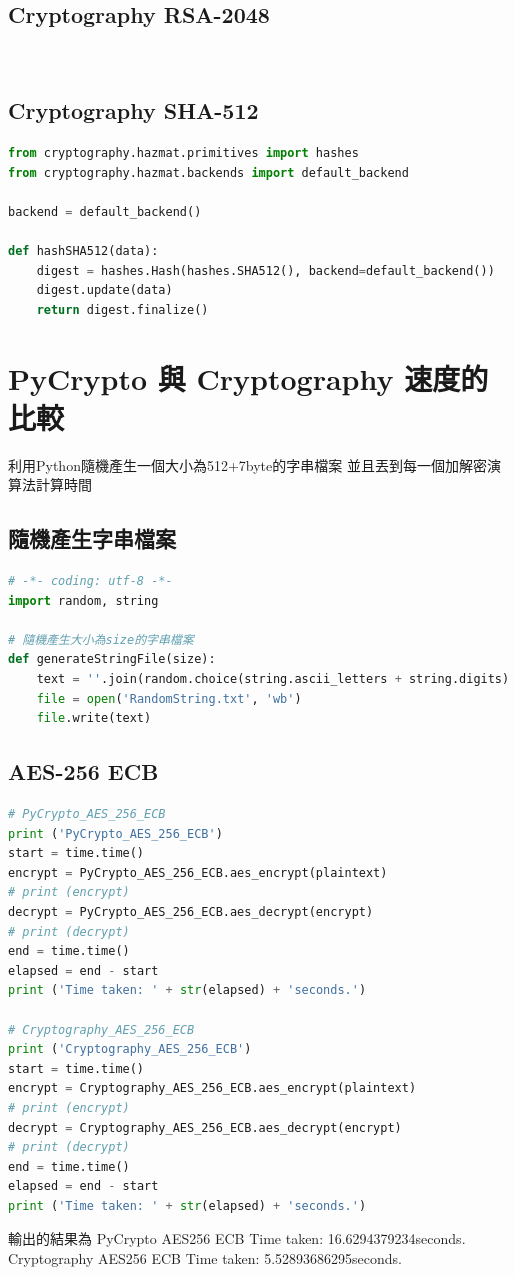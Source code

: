 \documentclass[12pt,a4paper]{article}
\begin{document}
\subsection{Cryptography RSA-2048}
{
\begin{lstlisting}[language=Python]
	
\end{lstlisting}
}

\subsection{Cryptography SHA-512}
{
\begin{lstlisting}[language=Python]
from cryptography.hazmat.primitives import hashes
from cryptography.hazmat.backends import default_backend

backend = default_backend()

def hashSHA512(data):
    digest = hashes.Hash(hashes.SHA512(), backend=default_backend())
    digest.update(data)
    return digest.finalize()
\end{lstlisting}
}

\newpage %
\section{PyCrypto 與 Cryptography 速度的比較}
利用Python隨機產生一個大小為512+7byte的字串檔案
並且丟到每一個加解密演算法計算時間
\subsection{隨機產生字串檔案}
{
\begin{lstlisting}[language=Python]
# -*- coding: utf-8 -*-
import random, string

# 隨機產生大小為size的字串檔案
def generateStringFile(size):
    text = ''.join(random.choice(string.ascii_letters + string.digits) for x in range(size))
    file = open('RandomString.txt', 'wb')
    file.write(text)
\end{lstlisting}
}

\subsection{AES-256 ECB}
{
\begin{lstlisting}[language=Python]
# PyCrypto_AES_256_ECB
print ('PyCrypto_AES_256_ECB')
start = time.time()
encrypt = PyCrypto_AES_256_ECB.aes_encrypt(plaintext)
# print (encrypt)
decrypt = PyCrypto_AES_256_ECB.aes_decrypt(encrypt)
# print (decrypt)
end = time.time()
elapsed = end - start
print ('Time taken: ' + str(elapsed) + 'seconds.')

# Cryptography_AES_256_ECB
print ('Cryptography_AES_256_ECB')
start = time.time()
encrypt = Cryptography_AES_256_ECB.aes_encrypt(plaintext)
# print (encrypt)
decrypt = Cryptography_AES_256_ECB.aes_decrypt(encrypt)
# print (decrypt)
end = time.time()
elapsed = end - start
print ('Time taken: ' + str(elapsed) + 'seconds.')
\end{lstlisting}
輸出的結果為
\newline PyCrypto AES256 ECB
Time taken: 16.6294379234seconds.
\newline Cryptography AES256 ECB
Time taken: 5.52893686295seconds.
}
\end{document}
